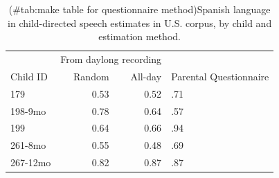 \documentclass[
]{article}
\begin{document}
\begin{table}[!h]

\caption{(\#tab:make table for questionnaire method)Spanish language in child-directed speech 
 estimates in U.S. corpus, by child and estimation method.}
\centering
\begin{tabular}[t]{lrrl}
\toprule
\multicolumn{1}{c}{ } & \multicolumn{2}{c}{From daylong recording} & \multicolumn{1}{c}{ } \\
\cmidrule(l{3pt}r{3pt}){2-3}
Child ID & Random & All-day & Parental Questionnaire\\
\midrule
179 & 0.53 & 0.52 & .71\\
198-9mo & 0.78 & 0.64 & .57\\
199 & 0.64 & 0.66 & .94\\
261-8mo & 0.55 & 0.48 & .69\\
267-12mo & 0.82 & 0.87 & .87\\
\bottomrule
\end{tabular}
\end{table}
\end{document}

